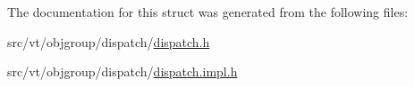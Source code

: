 The documentation for this struct was generated from the following files\+:\begin{DoxyCompactItemize}
\item 
src/vt/objgroup/dispatch/\hyperlink{objgroup_2dispatch_2dispatch_8h}{dispatch.\+h}\item 
src/vt/objgroup/dispatch/\hyperlink{objgroup_2dispatch_2dispatch_8impl_8h}{dispatch.\+impl.\+h}\end{DoxyCompactItemize}
